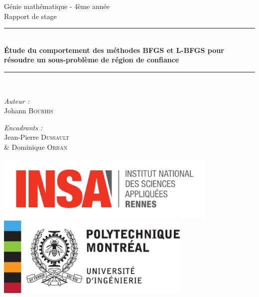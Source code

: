 \documentclass[10pt,a4paper]{article}
\theoremstyle{definition}
\theoremstyle{plain}
\theoremstyle{remark}
\begin{document}

\begin{titlepage}
\begin{center}

{\large Génie mathématique - 4ème année}\\[0.5cm]

{\large Rapport de stage}\\[0.5cm]

\rule{\linewidth}{0.5mm} \\[0.4cm]
{ \huge \bfseries Étude du comportement des méthodes BFGS et L-BFGS pour résoudre un sous-problème de région de confiance \\[0.4cm] }
\rule{\linewidth}{0.5mm} \\[1.5cm]

\noindent
\begin{minipage}{0.4\textwidth}
  \begin{flushleft} \large
    \emph{Auteur :}\\
    Johann \textsc{Bourhis}\\
  \end{flushleft}
\end{minipage}%
\begin{minipage}{0.4\textwidth}
  \begin{flushright} \large
    \emph{Encadrants :} \\
    Jean-Pierre \textsc{Dussault}\\
    \& Dominique \textsc{Orban}\\
  \end{flushright}
\end{minipage}

\vspace{0.3cm}

\includegraphics[width=0.8\textwidth]{logo}\\[1cm]

\includegraphics[width=0.7\textwidth]{Polytechnique}\\[1cm]


\end{center}
\end{titlepage}
\end{document}
